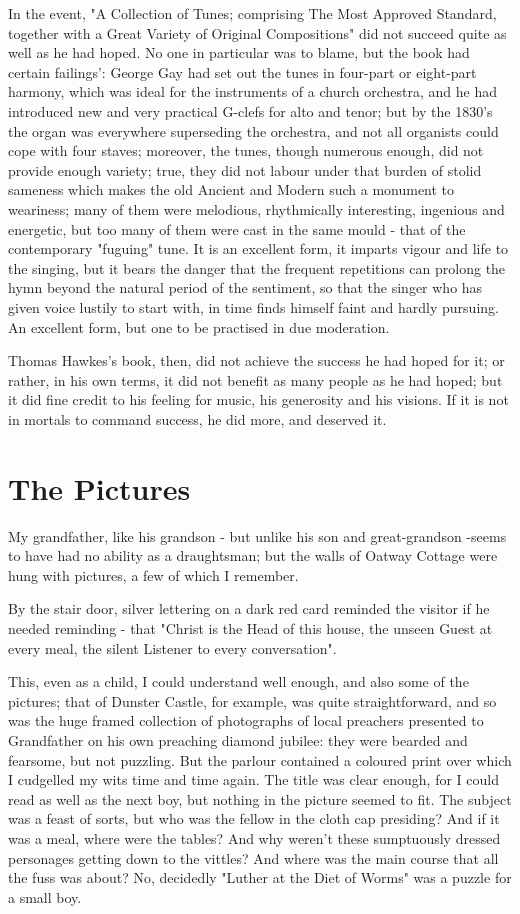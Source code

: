 In the event, "A Collection of Tunes; comprising The Most Approved Standard, together with a Great Variety of Original Compositions" did not succeed quite as well as he had hoped. No one in particular was to blame, but the book had certain failings': George Gay had set out the tunes in four-part or eight-part harmony, which was ideal for the instruments of a church orchestra, and he had introduced new and very practical G-clefs for alto and tenor; but by the 1830's the organ was everywhere superseding the orchestra, and not all organists could cope with four staves; moreover, the tunes, though numerous enough, did not provide enough variety; true, they did not labour under that burden of stolid sameness which makes the old Ancient and Modern such a monument to weariness; many of them were melodious, rhythmically interesting, ingenious and energetic, but too many of them were cast in the same mould - that of the contemporary "fuguing" tune. It is an excellent form, it imparts vigour and life to the singing, but it bears the danger that the frequent repetitions can prolong the hymn beyond the natural period of the sentiment, so that the singer who has given voice lustily to start with, in time finds himself faint and hardly pursuing. An excellent form, but one to be practised in due moderation.

Thomas Hawkes's book, then, did not achieve the success he had hoped for it; or rather, in his own terms, it did not benefit as many people as he had hoped; but it did fine credit to his feeling for music, his generosity and his visions. If it is not in mortals to command success, he did more, and deserved it.
 
\section{The Pictures}

My grandfather, like his grandson - but unlike his son and great-grandson -seems to have had no ability as a draughtsman; but the walls of Oatway Cottage were hung with pictures, a few of which I remember.

By the stair door, silver lettering on a dark red card reminded the visitor if he needed reminding - that "Christ is the Head of this house, the unseen Guest at every meal, the silent Listener to every conversation".

This, even as a child, I could understand well enough, and also some of the pictures; that of Dunster Castle, for example, was quite straightforward, and so was the huge framed collection of photographs of local preachers presented to Grandfather on his own preaching diamond jubilee: they were bearded and fearsome, but not puzzling. But the parlour contained a coloured print over which I cudgelled my wits time and time again. The title was clear enough, for I could read as well as the next boy, but nothing in the picture seemed to fit. The subject was a feast of sorts, but who was the fellow in the cloth cap presiding? And if it was a meal, where were the tables? And why weren't these sumptuously dressed personages getting down to the vittles? And where was the main course that all the fuss was about? No, decidedly "Luther at the Diet of Worms" was a puzzle for a small boy.

